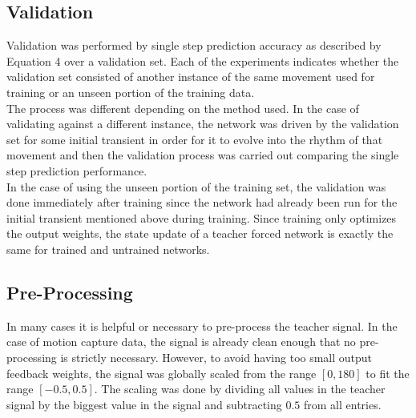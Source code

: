 \documentclass[letterpaper,9pt]{article}
\begin{document}


\subsection{Validation}

Validation was performed by single step prediction accuracy as described by Equation 4 over a validation set. Each of the experiments indicates whether the validation set consisted of another instance of the same movement used for training or an unseen portion of the training data.\\

The process was different depending on the method used. In the case of validating against a different instance, the network was driven by the validation set for some initial transient in order for it to evolve into the rhythm of that movement and then the validation process was carried out comparing the single step prediction performance.\\

In the case of using the unseen portion of the training set, the validation was done immediately after training since the network had already been run for the initial transient mentioned above during training. Since training only optimizes the output weights, the state update of a teacher forced network is exactly the same for trained and untrained networks. 

\subsection{Pre-Processing}

In many cases it is helpful or necessary to pre-process the teacher signal. In the case of motion capture data, the signal is already clean enough that no pre-processing is strictly necessary. However, to avoid having too small output feedback weights, the signal was globally scaled from the range $[0,180]$ to fit the range $[-0.5,0.5]$. The scaling was done by dividing all values in the teacher signal by the biggest value in the signal and subtracting $0.5$ from all entries.  
\end{document}
